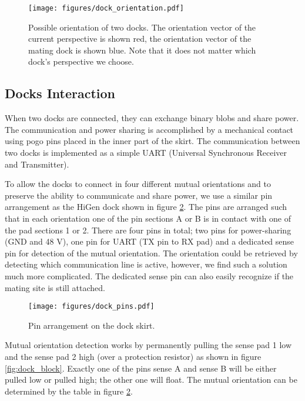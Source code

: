 \begin{figure}[!ht]
    \centering
    \texttt{[image: figures/dock\_orientation.pdf]}
    \caption{Possible orientation of two docks. The orientation vector of the
    current perspective is shown red, the orientation vector of the mating dock
    is shown blue. Note that it does not matter which dock's perspective we
    choose.}
    \label{fig:dock_orientation}
\end{figure}


\subsection{Docks Interaction}\label{sec:dock_interaction}

When two docks are connected, they can exchange binary blobs and share power.
The communication and power sharing is accomplished by a mechanical contact
using pogo pins placed in the inner part of the skirt. The communication between
two docks is implemented as a simple UART (Universal Synchronous Receiver and
Transmitter).

To allow the docks to connect in four different mutual orientations and to
preserve the ability to communicate and share power, we use a similar pin
arrangement as the HiGen dock \cite{parrott_higen:_2014} shown in figure
\ref{fig:dock_pins}. The pins are arranged such that in each orientation one of
the pin sections A or B is in contact with one of the pad sections 1 or 2. There
are four pins in total; two pins for power-sharing (GND and 48 V), one pin for
UART (TX pin to RX pad) and a dedicated sense pin for detection of the mutual
orientation. The orientation could be retrieved by detecting which communication
line is active, however, we find such a solution much more complicated. The
dedicated sense pin can also easily recognize if the mating site is still
attached.

\begin{figure}[t]
    \centering
    \texttt{[image: figures/dock\_pins.pdf]}
    \caption{Pin arrangement on the dock skirt. }
    \label{fig:dock_pins}
\end{figure}

Mutual orientation detection works by permanently pulling the sense pad 1 low
and the sense pad 2 high (over a protection resistor) as shown in figure
\ref{fig:dock_block}. Exactly one of the pins sense A and sense B will be either
pulled low or pulled high; the other one will float. The mutual orientation can
be determined by the table in figure \ref{fig:dock_pins}.


